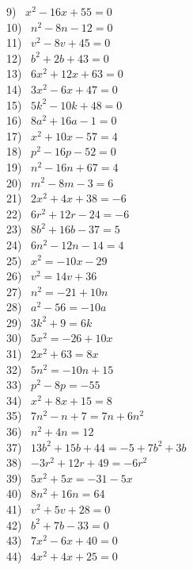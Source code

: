 \documentclass[12pt]{book}
\theoremstyle{definition}
\begin{document}
\begin{multicols}{2}
  9)~ $x^2 - 16 x + 55 = 0$\\
  10)~ $n^2 - 8 n - 12 = 0$\\
  11)~ $v^2 - 8 v + 45 = 0$\\
  12)~ $b^2 + 2 b + 43 = 0$\\
  13)~ $6 x^2 + 12 x + 63 = 0$\\
  14)~ $3 x^2 - 6 x + 47 = 0$\\
  15)~ $5 k^2 - 10 k + 48 = 0$\\
  16)~ $8 a^2 + 16 a - 1 = 0$\\
  17)~ $x^2 + 10 x - 57 = 4$\\
  18)~ $p^2 - 16 p - 52 = 0$\\
  19)~ $n^2 - 16 n + 67 = 4$\\
  20)~ $m^2 - 8 m - 3 = 6$\\
  21)~ $2 x^2 + 4 x + 38 = - 6$\\
  22)~ $6 r^2 + 12 r - 24 = - 6$\\
  23)~ $8 b^2 + 16 b - 37 = 5$\\
  24)~ $6 n^2 - 12 n - 14 = 4$\\
  25)~ $x^2 = - 10 x - 29$\\
  26)~ $v^2 = 14 v + 36$\\
  27)~ $n^2 = - 21 + 10 n$\\
  28)~ $a^2 - 56 = - 10 a$\\
  29)~ $3 k^2 + 9 = 6 k$\\
  30)~ $5 x^2 = - 26 + 10 x$\\
  31)~ $2 x^2 + 63 = 8 x$\\
  32)~ $5 n^2 = - 10 n + 15$\\
  33)~ $p^2 - 8 p = - 55$\\
  34)~ $x^2 + 8 x + 15 = 8$\\
  35)~ $7 n^2 - n + 7 = 7 n + 6 n^2$\\
  36)~ $n^2 + 4 n = 12$\\
  37)~ $13 b^2 + 15 b + 44 = - 5 + 7 b^2 + 3 b$\\
  38)~ $- 3 r^2 + 12 r + 49 = - 6 r^2$\\
  39)~ $5 x^2 + 5 x = - 31 - 5 x$\\
  40)~ $8 n^2 + 16 n = 64$\\
  41)~ $v^2 + 5 v + 28 = 0$\\
  42)~ $b^2 + 7 b - 33 = 0$\\
  43)~ $7 x^2 - 6 x + 40 = 0$\\
  44)~ $4 x^2 + 4 x + 25 = 0$\\

\end{multicols}
\end{document}
